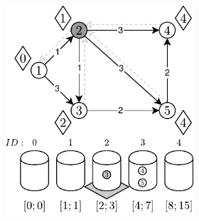 \begin{figure}[!ht]
\begin{subfigure}[b]{\textwidth}
\begin{subfigure}[b]{0.32\textwidth}
			\caption{}
			\label{fig:exampleRadixHeapNC:b}
		\end{subfigure}
		\hfill
		\begin{subfigure}[b]{0.32\textwidth}
			\includegraphics[width=\textwidth]{Chapter_II/RADIX-HEAP-NC-Example/c.pdf}
			\caption{}
			\label{fig:exampleRadixHeapNC:c}
		\end{subfigure}
		\hfill\null
	\end{subfigure}
	\begin{subfigure}[b]{\textwidth}
		\null\hfill
		\begin{subfigure}[b]{0.32\textwidth}

\end{subfigure}
\end{subfigure}
\end{figure}
